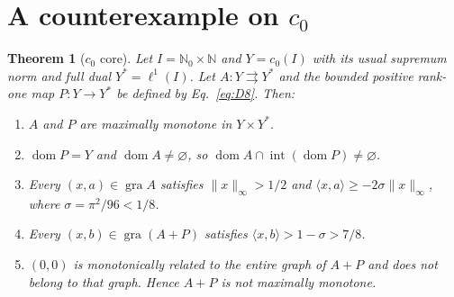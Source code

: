 \documentclass[11pt]{article}
\newcommand{\N}{\mathbb N}
\newcommand{\Nzero}{\mathbb N_0}
\newcommand{\gra}{\operatorname{gra}}
\newcommand{\dom}{\operatorname{dom}}
\newcommand{\pair}[2]{\langle #1,#2\rangle}
\newtheorem{theorem}{Theorem}
\begin{document}
\section{A counterexample on $c_0$}
\label{sec:c0}
\label{sec:statements}
\renewcommand{\thetheorem}{C}
\begin{theorem}[$c_0$ core]\label{thm:C}
Let $I=\Nzero\times\N$ and $Y=c_0(I)$ with its usual supremum norm and
full dual $Y^*=\ell^1(I)$. Let $A:Y\rightrightarrows Y^*$ and the bounded
positive rank-one map $P:Y\to Y^*$ be defined by Eq.~\eqref{eq:D8}.
Then:
\begin{enumerate}
\item $A$ and $P$ are maximally monotone in $Y\times Y^*$.
\item $\dom P=Y$ and $\dom A\ne\varnothing$, so
$\dom A\cap\operatorname{int}(\dom P)\ne\varnothing$.
\item Every $(x,a)\in\gra A$ satisfies $\|x\|_\infty>1/2$ and
$\pair{x}{a}\ge-2\sigma\|x\|_\infty$, where $\sigma=\pi^2/96<1/8$.
\item Every $(x,b)\in\gra(A+P)$ satisfies
$\pair{x}{b}>1-\sigma>7/8$.
\item $(0,0)$ is monotonically related to the entire graph of $A+P$ and
does not belong to that graph. Hence $A+P$ is not maximally monotone.
\end{enumerate}
\end{theorem}
\end{document}
